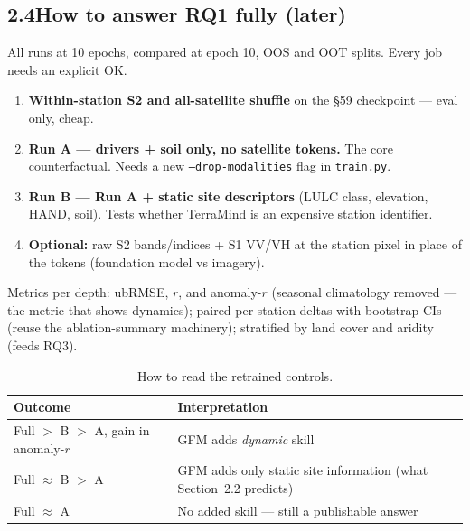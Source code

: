 \documentclass[11pt,a4paper]{article}
\begin{document}
\subsection*{2.4\quad How to answer RQ1 fully (later)}

All runs at 10 epochs, compared at epoch 10, OOS and OOT splits. Every job needs an explicit OK.
\begin{enumerate}
\item \textbf{Within-station S2 and all-satellite shuffle} on the \S59 checkpoint --- eval only, cheap.
\item \textbf{Run A --- drivers + soil only, no satellite tokens.} The core counterfactual.
      Needs a new \texttt{--drop-modalities} flag in \texttt{train.py}.
\item \textbf{Run B --- Run A + static site descriptors} (LULC class, elevation, HAND, soil).
      Tests whether TerraMind is an expensive station identifier.
\item \textbf{Optional:} raw S2 bands/indices + S1 VV/VH at the station pixel in place of the tokens
      (foundation model vs imagery).
\end{enumerate}
Metrics per depth: ubRMSE, $r$, and anomaly-$r$ (seasonal climatology removed --- the metric that shows
dynamics); paired per-station deltas with bootstrap CIs (reuse the ablation-summary machinery);
stratified by land cover and aridity (feeds RQ3).

\begin{table}[h]
\centering\small
\caption{How to read the retrained controls.}
\begin{tabularx}{\linewidth}{@{}l X@{}}
\toprule
Outcome & Interpretation \\
\midrule
Full $>$ B $>$ A, gain in anomaly-$r$ & GFM adds \emph{dynamic} skill \\
Full $\approx$ B $>$ A               & GFM adds only static site information (what Section~2.2 predicts) \\
Full $\approx$ A                     & No added skill --- still a publishable answer \\
\bottomrule
\end{tabularx}
\end{table}
\end{document}
